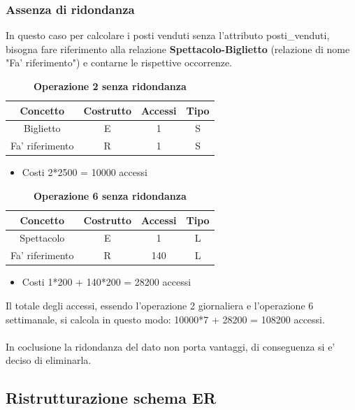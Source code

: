\documentclass[10pt]{article}
\begin{document}
	\subsubsection{Assenza di ridondanza}
	In questo caso per calcolare i posti venduti senza l'attributo posti\_venduti, bisogna fare riferimento alla relazione \textbf{Spettacolo-Biglietto} (relazione di nome "Fa' riferimento") e contarne le rispettive occorrenze.	
	\begin{table}[h!]
		\centering
		\caption{\textbf{Operazione 2 senza ridondanza}} \label{tab:Op2 w/o ridondanza}
		\begin{tabular}{|c|c|c|c|}
			\hline
			\textbf{Concetto} & \textbf{Costrutto} & \textbf{Accessi} & \textbf{Tipo} \\
			\hline
			Biglietto & E & 1 & S \\
			\hline
			Fa' riferimento & R & 1 & S \\
			\hline
		\end{tabular}
		\begin{itemize}
			\item Costi 2*2500 = 10000 accessi 
		\end{itemize}	
	\end{table}
	\begin{table}[h!]
		\centering
		\caption{\textbf{Operazione 6 senza ridondanza}} \label{tab:Op6 w/o ridondanza}
		\begin{tabular}{|c|c|c|c|}
			\hline
			\textbf{Concetto} & \textbf{Costrutto} & \textbf{Accessi} & \textbf{Tipo} \\
			\hline
			Spettacolo & E & 1 & L \\
			\hline
			Fa' riferimento & R &140&L\\
			\hline
		\end{tabular}
		\begin{itemize}
			\item Costi 1*200 + 140*200 = 28200 accessi
		\end{itemize}
	\end{table}

	Il totale degli accessi, essendo l'operazione 2 giornaliera e l'operazione 6 settimanale, si calcola in questo modo: 10000*7 + 28200 = 108200 accessi.\\\\
	In coclusione la ridondanza del dato non porta vantaggi, di conseguenza si e' deciso di eliminarla.
	\subsection{Ristrutturazione schema ER}
\end{document}
